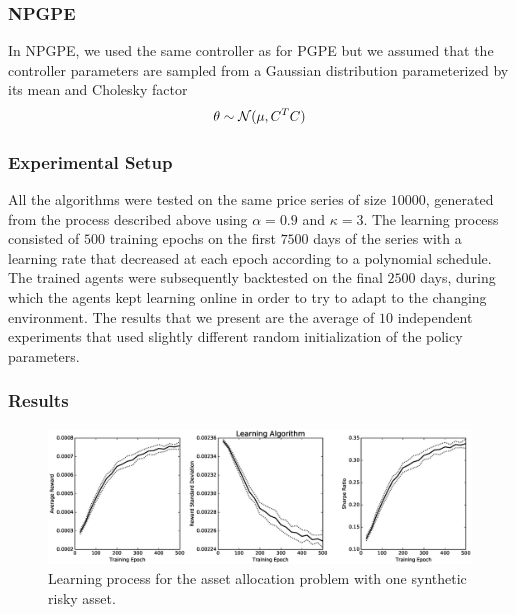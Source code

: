 \subsubsection{NPGPE}
In NPGPE, we used the same controller as for PGPE but we assumed that the controller parameters are sampled from a Gaussian distribution parameterized by its mean and Cholesky factor
\begin{equation*}
	\theta \sim \mathcal{N}(\mu, C^T C)
\end{equation*}  


\subsubsection{Experimental Setup}   
All the algorithms were tested on the same price series of size $10000$, generated from the process described above using $\alpha = 0.9$ and $\kappa = 3$. The learning process consisted of $500$ training epochs on the first $7500$ days of the series with a learning rate that decreased at each epoch according to a polynomial schedule. The trained agents were subsequently backtested on the final $2500$ days, during which the agents kept learning online in order to try to adapt to the changing environment. The results that we present are the average of $10$ independent experiments that used slightly different random initialization of the policy parameters.   

\subsubsection{Results}

\begin{figure}[t]
	\centering
	\includegraphics[width=1.0\textwidth]{Images/6_0_single_synthetic_convergence}
	\caption[Learning process for one synthetic risky asset]{Learning process for the asset allocation problem with one synthetic risky asset.}
	\label{fig:single_synthetic_convergence}
\end{figure}

